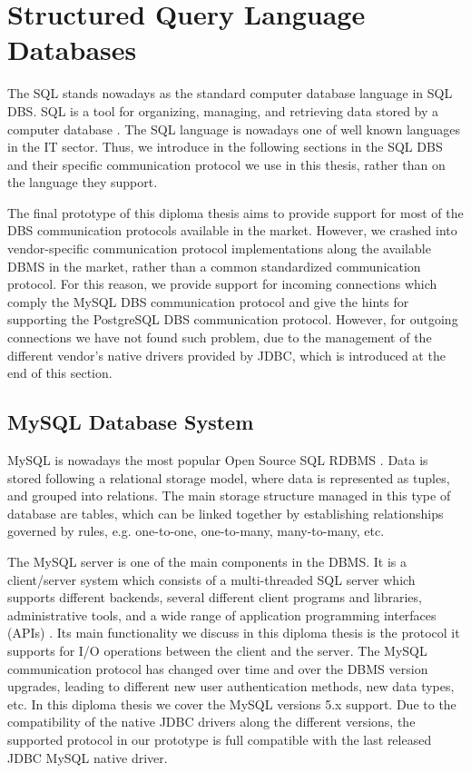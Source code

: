 \section{Structured Query Language Databases}
\label{sec:fundamentalssql}  

The \ac{SQL} stands nowadays as the standard computer database language in \ac{SQL} \ac{DBS}. \ac{SQL} is a tool for organizing, managing, and retrieving data stored by a computer database \cite{sql1999}. The \ac{SQL} language is nowadays one of well known languages in the IT sector. Thus, we introduce in the following sections in the \ac{SQL} \ac{DBS} and their specific communication protocol we use in this thesis, rather than on the language they support. 

The final prototype of this diploma thesis aims to provide support for most of the \ac{DBS} communication protocols available in the market. However, we crashed into vendor-specific communication protocol implementations along the available \ac{DBMS} in the market, rather than a common standardized communication protocol. For this reason, we provide support for incoming connections which comply the MySQL \ac{DBS} communication protocol and give the hints for supporting the PostgreSQL \ac{DBS} communication protocol. However, for outgoing connections we have not found such problem, due to the management of the different vendor's native drivers provided by \ac{JDBC}, which is introduced at the end of this section. 

\subsection{MySQL Database System}
MySQL is nowadays the most popular Open Source SQL \ac{RDBMS} \cite{mysqlmanual}. Data is stored following a relational storage model, where data is represented as tuples, and grouped into relations. The main storage structure managed in this type of database are tables, which can be linked together by establishing relationships governed by rules, e.g. one-to-one, one-to-many, many-to-many, etc. 

The MySQL server is one of the main components in the \ac{DBMS}. It is a client/server system which consists of a multi-threaded SQL server which supports different backends, several different client programs and libraries, administrative tools, and a wide range of application programming interfaces (APIs) \cite{mysqlmanual}. Its main functionality we discuss in this diploma thesis is the protocol it supports for I/O operations between the client and the server. The MySQL communication protocol has changed over time and over the \ac{DBMS} version upgrades, leading to different new user authentication methods, new data types, etc. In this diploma thesis we cover the MySQL versions 5.x support. Due to the compatibility of the native \ac{JDBC} drivers along the different versions, the supported protocol in our prototype is full compatible with the last released \ac{JDBC} MySQL native driver.

